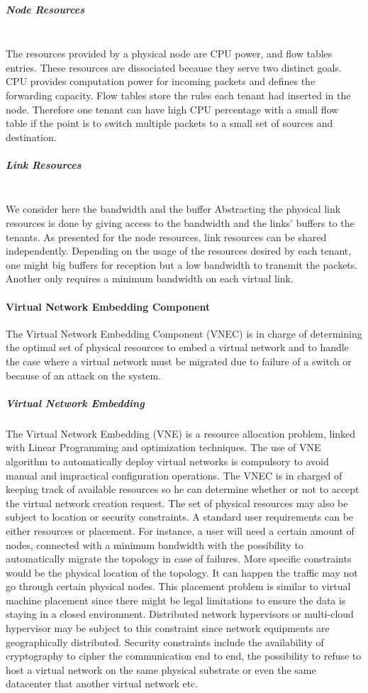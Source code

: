 \subparagraph{\textbf{Node Resources}}\textbf{}\\
The resources provided by a physical node are CPU power, and flow tables entries.
These resources are dissociated because they serve two distinct goals.
CPU provides computation power for incoming packets and defines the forwarding capacity.
Flow tables store the rules each tenant had inserted in the node.
Therefore one tenant can have high CPU percentage with a small flow table if the point is to switch multiple packets to a small set of sources and destination.

\subparagraph{\textbf{Link Resources}}\textbf{}\\
We consider here the bandwidth and the buffer
Abstracting the physical link resources is done by giving access to the bandwidth and the links' buffers to the tenants.
As presented for the node resources, link resources can be shared independently.
Depending on the usage of the resources desired by each tenant, one might big buffers for reception but a low bandwidth to transmit the packets.
Another only requires a minimum bandwidth on each virtual link.

\paragraph{Virtual Network Embedding Component}

The Virtual Network Embedding Component (VNEC) is in charge of determining the optimal set of physical resources to embed a virtual network and to handle the case where a virtual network must be migrated due to failure of a switch or because of an attack on the system.

\subparagraph{Virtual Network Embedding}
The Virtual Network Embedding (VNE) is a resource allocation problem, linked with Linear Programming and optimization techniques.
The use of VNE algorithm to automatically deploy virtual networks is compulsory to avoid manual and impractical configuration operations.
The VNEC is in charged of keeping track of available resources so he can determine whether or not to accept the virtual network creation request.
The set of physical resources may also be subject to location or security constraints.
A standard user requirements can be either resources or placement.
For instance, a user will need a certain amount of nodes, connected with a minimum bandwidth with the possibility to automatically migrate the topology in case of failures.
More specific constraints would be the physical location of the topology.
It can happen the traffic may not go through certain physical nodes.
This placement problem is similar to virtual machine placement since there might be legal limitations to ensure the data is staying in a closed environment.
Distributed network hypervisors or multi-cloud hypervisor may be subject to this constraint since network equipments are geographically distributed.
Security constraints include the availability of cryptography to cipher the communication end to end, the possibility to refuse to host a virtual network on the same physical substrate or even the same datacenter that another virtual network etc.

